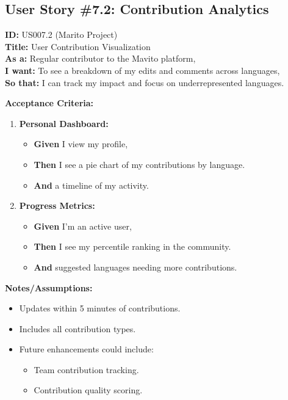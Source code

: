 \documentclass[12pt]{article}
\begin{document}
\subsection{User Story \#7.2: Contribution Analytics}

\textbf{ID:} US007.2 (Marito Project) \\
\textbf{Title:} User Contribution Visualization \\
\textbf{As a:} Regular contributor to the Mavito platform, \\
\textbf{I want:} To see a breakdown of my edits and comments across languages, \\
\textbf{So that:} I can track my impact and focus on underrepresented languages.

\vspace{1em}
\textbf{Acceptance Criteria:}
\begin{enumerate}
    \item \textbf{Personal Dashboard:}
    \begin{itemize}
        \item \textbf{Given} I view my profile,
        \item \textbf{Then} I see a pie chart of my contributions by language.
        \item \textbf{And} a timeline of my activity.
    \end{itemize}

    \item \textbf{Progress Metrics:}
    \begin{itemize}
        \item \textbf{Given} I'm an active user,
        \item \textbf{Then} I see my percentile ranking in the community.
        \item \textbf{And} suggested languages needing more contributions.
    \end{itemize}
\end{enumerate}

\vspace{1em}
\textbf{Notes/Assumptions:}
\begin{itemize}
    \item Updates within 5 minutes of contributions.
    \item Includes all contribution types.
    \item Future enhancements could include:
    \begin{itemize}
        \item Team contribution tracking.
        \item Contribution quality scoring.
    \end{itemize}
\end{itemize}
\end{document}
